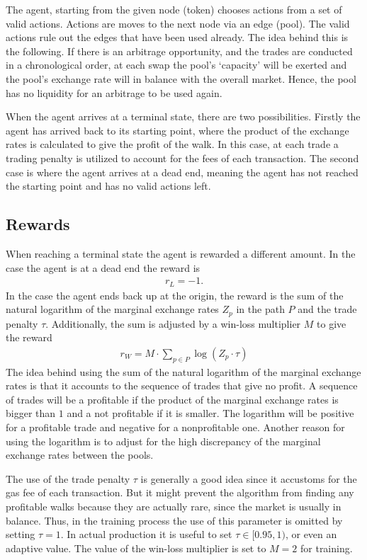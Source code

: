 The agent, starting from the given node (token) chooses actions from a set of
valid actions. Actions are moves to the next node via an edge (pool). The
valid actions rule out the edges that have been used already. The idea behind
this is the following. If there is an arbitrage opportunity, and the trades
are conducted in a chronological order, at each swap the pool's `capacity'
will be exerted and the pool's exchange rate will in balance with the overall
market. Hence, the pool has no liquidity for an arbitrage to be used again.
\newline

When the agent arrives at a terminal state, there are two possibilities.
Firstly the agent has arrived back to its starting point, where the product
of the exchange rates is calculated to give the profit of the walk. In this
case, at each trade a trading penalty is utilized to account for the fees
of each transaction. The second case is where the agent arrives at a dead
end, meaning the agent has not reached the starting point and has no valid
actions left.

\subsection{Rewards}
When reaching a terminal state the agent is rewarded a different amount. In
the case the agent is at a dead end the reward is
\begin{align}
    r_L = -1.
\end{align}
In the case the agent ends back up at the origin, the reward is the sum of
the natural logarithm of the marginal exchange rates $Z_p$ in the path $P$
and the trade penalty $\tau$. Additionally, the sum is adjusted by a
win-loss multiplier $M$ to give the reward
\begin{align}
    r_W = M \cdot \sum_{p \in P} \log(Z_p \cdot \tau)
\end{align}
The idea behind using the sum of the natural logarithm of the marginal
exchange rates is that it accounts to the sequence of trades that give no
profit. A sequence of trades will be a profitable if the product of the
marginal exchange rates is bigger than $1$ and a not profitable if it is
smaller. The logarithm will be positive for a profitable trade and negative
for a nonprofitable one. Another reason for using the logarithm is to adjust
for the high discrepancy of the marginal exchange rates between the pools.
\newline

The use of the trade penalty $\tau$ is generally a good idea since it
accustoms for the gas fee of each transaction. But it might prevent the
algorithm from finding any profitable walks because they are actually rare,
since the market is usually in balance. Thus, in the training process the use
of this parameter is omitted by setting $\tau = 1$. In actual production it
is useful to set $\tau \in [0.95, 1)$, or even an adaptive value. The value
of the win-loss multiplier is set to $M=2$ for training.

